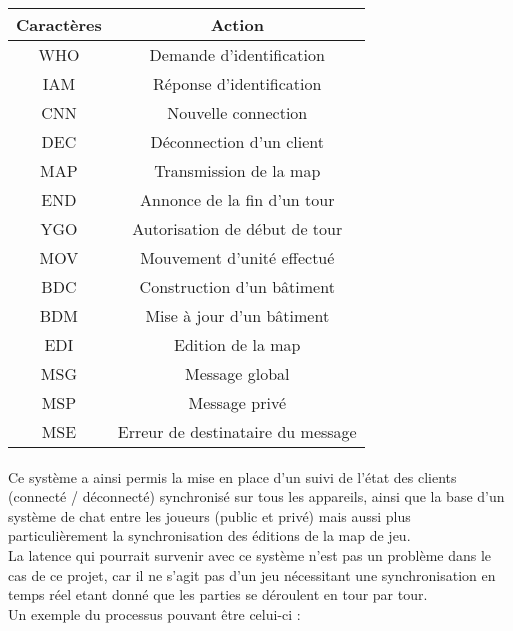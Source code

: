 \documentclass[12pt]{report}
\begin{document}
\begin{center}
\begin{tabular}{c|c}
\toprule
\textbf{Caractères}  & \textbf{Action}\\ 
\midrule
WHO & Demande d’identification \\
IAM & Réponse d'identification \\
CNN & Nouvelle connection \\
DEC & Déconnection d’un client \\
MAP & Transmission de la map \\
END & Annonce de la fin d’un tour \\
YGO & Autorisation de début de tour\\
MOV & Mouvement d’unité effectué\\
BDC & Construction d’un bâtiment\\
BDM & Mise à jour d’un bâtiment\\
EDI & Edition de la map\\
MSG & Message global\\
MSP & Message privé\\
MSE & Erreur de destinataire du message\\
\bottomrule
\end{tabular}
\end{center}

\paragraph{}
Ce système a ainsi permis la mise en place d’un suivi de l’état des clients (connecté / déconnecté) synchronisé sur tous les appareils, ainsi que la base d’un système de chat entre les joueurs (public et privé) mais aussi plus particulièrement la synchronisation des éditions de la map de jeu.\\
La latence qui pourrait survenir avec ce système n’est pas un problème dans le cas de ce projet, car il ne s’agit pas d’un jeu nécessitant une synchronisation en temps réel etant donné que les parties se déroulent en tour par tour. \\
Un exemple du processus pouvant être celui-ci : 
\end{document}
